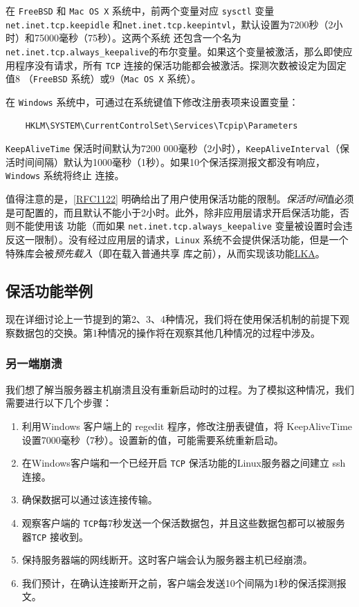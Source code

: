 在 \verb|FreeBSD| 和 \verb|Mac OS X| 系统中，前两个变量对应 \verb|sysctl| 变量 \verb|net.inet.tcp.keepidle| 和\verb|net.inet.tcp.keepintvl|，默认设置为7200秒（2小时）和75000毫秒（75秒）。这两个系统
还包含一个名为\verb|net.inet.tcp.always_keepalive|的布尔变量。如果这个变量被激活，那么即使应用程序没有请求，所有 \verb|TCP| 连接的保活功能都会被激活。探测次数被设定为固定值8
（\verb|FreeBSD| 系统）或9（\verb|Mac OS X| 系统）。

在 \verb|Windows| 系统中，可通过在系统键值下修改注册表项来设置变量：
\begin{verbatim}
    HKLM\SYSTEM\CurrentControlSet\Services\Tcpip\Parameters
\end{verbatim}

\verb|KeepAliveTime| 保活时间默认为7200 000毫秒（2小时），\verb|KeepAliveInterval|（保活时间间隔）默认为1000毫秒（1秒）。如果10个保活探测报文都没有响应，\verb|Windows| 系统将终止
连接。

值得注意的是，\href{https://www.rfc-editor.org/rfc/rfc1122}{[RFC1122]} 明确给出了用户使用保活功能的限制。\emph{保活时间}值必须是可配置的，而且默认不能小于2小时。此外，除非应用层请求开启保活功能，否则不能使用该
功能（而如果 \verb|net.inet.tcp.always_keepalive| 变量被设置时会违反这一限制）。没有经过应用层的请求，\verb|Linux| 系统不会提供保活功能，但是一个特殊库会被\emph{预先载入}（即在载入普通共享
库之前），从而实现该功能\href{https://libkeepalive.sourceforge.net/}{LKA}。

\subsection{保活功能举例}
现在详细讨论上一节提到的第2、3、4种情况，我们将在使用保活机制的前提下观察数据包的交换。第1种情况的操作将在观察其他几种情况的过程中涉及。
\subsubsection{另一端崩溃}
我们想了解当服务器主机崩溃且没有重新启动时的过程。为了模拟这种情况，我们需要进行以下几个步骤：
\begin{enumerate}
    \item 利用Windows 客户端上的 regedit 程序，修改注册表键值，将 KeepAliveTime 设置7000毫秒（7秒）。设置新的值，可能需要系统重新启动。
    \item 在Windows客户端和一个已经开启 \verb|TCP| 保活功能的Linux服务器之间建立 ssh 连接。
    \item 确保数据可以通过该连接传输。
    \item 观察客户端的 \verb|TCP|每7秒发送一个保活数据包，并且这些数据包都可以被服务器\verb|TCP| 接收到。
    \item 保持服务器端的网线断开。这时客户端会认为服务器主机已经崩溃。
    \item 我们预计，在确认连接断开之前，客户端会发送10个间隔为1秒的保活探测报文。
\end{enumerate}

